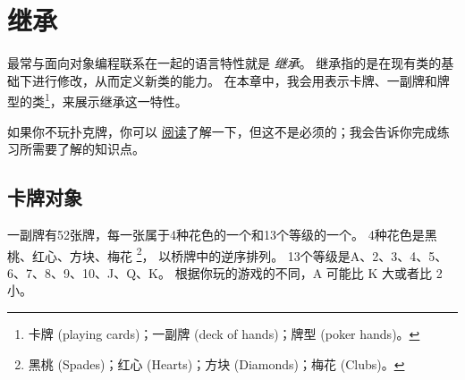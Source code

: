 


\chapter{继承}


最常与面向对象编程联系在一起的语言特性就是 {\em 继承}。
继承指的是在现有类的基础下进行修改，从而定义新类的能力。
在本章中，我会用表示卡牌、一副牌和牌型的类\footnote{卡牌 (playing cards)；一副牌
(deck of hands)；牌型 (poker hands)。}，来展示继承这一特性。

    


如果你不玩扑克牌，你可以 \href{http://en.wikipedia.org/wiki/Poker}{阅读}了解一下，但这不是必须的；我会告诉你完成练习所需要了解的知识点。


\section{卡牌对象}


一副牌有52张牌，每一张属于4种花色的一个和13个等级的一个。
4种花色是黑桃、红心、方块、梅花 \footnote{黑桃 (Spades)；红心 (Hearts)；方块 (Diamonds)；梅花 (Clubs)。}，
以桥牌中的逆序排列。  13个等级是A、2、3、4、5、6、7、8、9、10、J、Q、K。
根据你玩的游戏的不同，A 可能比 K 大或者比 2 小。

